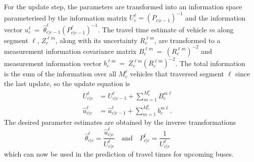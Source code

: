 For the update step, the parameters are transformed into an information
space parameterised by the information matrix $U^\ell_c = (P_{c|c-1})^{-1}$
and the information vector $u^\ell_c~=~\hat \theta^\ell_{c|c-1} (P^\ell_{c|c-1})^{-1}$.
The travel time estimate of vehicle $m$ along segment $\ell$,
$Z_c^{\ell m}$, along with its uncertainty $R^{\ell m}_c$,
are transformed to a measurement information covariance matrix 
$B_c^{\ell m}~=~(R^{\ell m}_c)^{-2}$
and measurement information vector $b_c^{\ell m}~=~Z^{\ell m}_c (R^{\ell m}_c)^{-2}$.
The total information is the sum of the information over all $M_c^\ell$ vehicles
that traversed segment $\ell$ since the last update,
so the update equation is
\begin{align*}
U^\ell_{c|c} &= U^\ell_{c|c-1} + \sum_{m=1}^{M_c^\ell} B^{m\ell}_{c} \\
\hat u^\ell_{c|c} &= \hat u^\ell_{c|c-1} + \sum_{m=1}^{M_c^\ell} b^{m\ell}_{c}.
\end{align*}
The desired parameter estimates are obtained 
by the inverse transformations
\begin{equation*}
\hat \theta^\ell_{c|c} = \frac{\hat u^\ell_{c|c}}{U^\ell_{c|c}} 
\quad\text{and}\quad
P^\ell_{c|c} = \frac{1}{U^\ell_{c|c}}
\end{equation*}
which can now be used in the prediction of travel times
for upcoming buses. 



